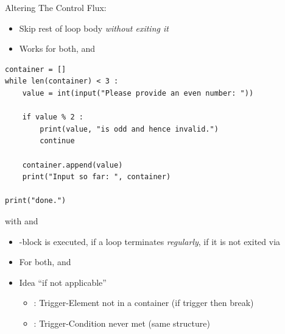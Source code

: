 
\begin{frame}[fragile]{Altering The Control Flux: }
%
\begin{itemize}
\item Skip rest of loop body \emph{without exiting it}
\item Works for both,  and 
\end{itemize}
%
\begin{codebox}
\begin{verbatim}
container = []
while len(container) < 3 :
    value = int(input("Please provide an even number: "))
    
    if value % 2 :
        print(value, "is odd and hence invalid.")
        continue
        
    container.append(value)
    print("Input so far: ", container)

print("done.")
\end{verbatim}
\end{codebox}
%
\end{frame}


\begin{frame}[fragile]{ with  and }
%
\begin{itemize}
\item {}-block is executed, if a loop terminates \emph{regularly}, \ie if it is not exited via 
\item For both,  and 
\item Idea \enquote{if not applicable}
	\begin{itemize}
	\item {}: Trigger-Element not in a container (if trigger then break)
	\item {}: Trigger-Condition never met (same structure)
	\end{itemize}
\end{itemize}
%
\end{frame}


